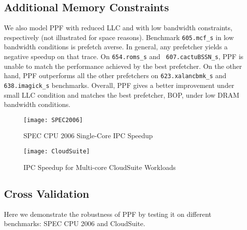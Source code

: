 \subsection{Additional Memory Constraints}
\label{Results-AdditionalMem}


We also model PPF with reduced LLC and with low bandwidth constraints,
respectively (not illustrated for space reasons). Benchmark {\tt 605.mcf\_s}
in low bandwidth conditions is prefetch averse. In general, any prefetcher
yields a negative speedup on that trace. On {\tt 654.roms\_s} and {\tt
607.cactuBSSN\_s}, PPF is unable to match the performance achieved by the best
prefetcher. On the other hand, PPF outperforms all the other prefetchers on
{\tt 623.xalancbmk\_s} and {\tt 638.imagick\_s} benchmarks. Overall, PPF
gives a better improvement under small LLC condition and matches the best
prefetcher, BOP, under low DRAM bandwidth conditions.

\begin{figure}[ht]
\texttt{[image: SPEC2006]}
\caption{SPEC CPU 2006 Single-Core IPC Speedup}
\label{Fig:SPEC2006_1core}
\end{figure}

\begin{figure}[ht]
\texttt{[image: CloudSuite]}
\caption{IPC Speedup for Multi-core CloudSuite Workloads}
\label{Fig:CloudSuite}
\end{figure}

\subsection{Cross Validation}
\label{Results-CrossVal}


Here we demonstrate the robustness of PPF by testing it on different
benchmarks: SPEC CPU 2006 and CloudSuite.



